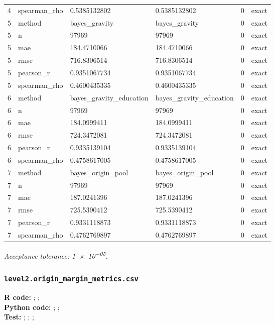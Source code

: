 \documentclass[10pt]{article}
\begin{document}
\begin{longtable}{@{}r p{}p{}p{}rl@{}}
4 & spearman\_\allowbreak{}rho & 0.5385132802 & 0.5385132802 & 0 & exact \\
5 & method & bayes\_\allowbreak{}gravity & bayes\_\allowbreak{}gravity & 0 & exact \\
5 & n & 97969 & 97969 & 0 & exact \\
5 & mae & 184.4710066 & 184.4710066 & 0 & exact \\
5 & rmse & 716.8306514 & 716.8306514 & 0 & exact \\
5 & pearson\_\allowbreak{}r & 0.9351067734 & 0.9351067734 & 0 & exact \\
5 & spearman\_\allowbreak{}rho & 0.4600435335 & 0.4600435335 & 0 & exact \\
6 & method & bayes\_\allowbreak{}gravity\_\allowbreak{}education & bayes\_\allowbreak{}gravity\_\allowbreak{}education & 0 & exact \\
6 & n & 97969 & 97969 & 0 & exact \\
6 & mae & 184.0999411 & 184.0999411 & 0 & exact \\
6 & rmse & 724.3472081 & 724.3472081 & 0 & exact \\
6 & pearson\_\allowbreak{}r & 0.9335139104 & 0.9335139104 & 0 & exact \\
6 & spearman\_\allowbreak{}rho & 0.4758617005 & 0.4758617005 & 0 & exact \\
7 & method & bayes\_\allowbreak{}origin\_\allowbreak{}pool & bayes\_\allowbreak{}origin\_\allowbreak{}pool & 0 & exact \\
7 & n & 97969 & 97969 & 0 & exact \\
7 & mae & 187.0241396 & 187.0241396 & 0 & exact \\
7 & rmse & 725.5390412 & 725.5390412 & 0 & exact \\
7 & pearson\_\allowbreak{}r & 0.9331118873 & 0.9331118873 & 0 & exact \\
7 & spearman\_\allowbreak{}rho & 0.4762769897 & 0.4762769897 & 0 & exact \\
\bottomrule
\end{longtable}
\normalsize
\textit{Acceptance tolerance: \num{1e-05}.}

\subsubsection{\texorpdfstring{\texttt{level2.origin\_margin\_metrics.csv}}{level2.origin\_margin\_metrics.csv}}
{\footnotesize \textbf{R code:} ; ; \\ \textbf{Python code:} ; ; \\ \textbf{Test:} ; ; ; \par}
\end{document}
